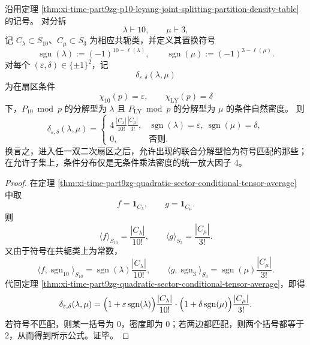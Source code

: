 \begin{theorem}[双二次扇区中的联合分解型条件密度全公式]\label{thm:xi-time-part9zg-quadratic-sector-conditional-splitting-density}
沿用定理 \ref{thm:xi-time-part9zg-p10-leyang-joint-splitting-partition-density-table} 的记号。
对分拆
\[
\lambda\vdash 10,
\qquad
\mu\vdash 3,
\]
记 \(C_\lambda\subset S_{10}\)、\(C_\mu\subset S_3\) 为相应共轭类，并定义其置换符号
\[
\operatorname{sgn}(\lambda):=(-1)^{10-\ell(\lambda)},
\qquad
\operatorname{sgn}(\mu):=(-1)^{3-\ell(\mu)}.
\]
对每个 \((\varepsilon,\delta)\in\{\pm1\}^2\)，记
\[
\delta_{\varepsilon,\delta}(\lambda,\mu)
\]
为在扇区条件
\[
\chi_{10}(p)=\varepsilon,
\qquad
\chi_{\mathrm{LY}}(p)=\delta
\]
下，\(P_{10}\bmod p\) 的分解型为 \(\lambda\) 且 \(P_{\mathrm{LY}}\bmod p\) 的分解型为 \(\mu\) 的条件自然密度。
则
\[
\boxed{\;
\delta_{\varepsilon,\delta}(\lambda,\mu)=
\begin{cases}
\displaystyle
4\,\frac{|C_\lambda|}{10!}\frac{|C_\mu|}{3!},
& \operatorname{sgn}(\lambda)=\varepsilon,\ \operatorname{sgn}(\mu)=\delta,\\[8pt]
0,
& \text{否则}.
\end{cases}\;}
\]
换言之，进入任一双二次扇区之后，允许出现的联合分解型恰为符号匹配的那些；在允许子集上，条件分布仅是无条件乘法密度的统一放大因子 \(4\)。
\end{theorem}
\begin{proof}
在定理 \ref{thm:xi-time-part9zg-quadratic-sector-conditional-tensor-average} 中取
\[
f=\mathbf 1_{C_\lambda},
\qquad
g=\mathbf 1_{C_\mu}.
\]
则
\[
\langle f\rangle_{S_{10}}=\frac{|C_\lambda|}{10!},
\qquad
\langle g\rangle_{S_3}=\frac{|C_\mu|}{3!}.
\]
又由于符号在共轭类上为常数，
\[
\langle f,\operatorname{sgn}_{10}\rangle_{S_{10}}
=
\operatorname{sgn}(\lambda)\frac{|C_\lambda|}{10!},
\qquad
\langle g,\operatorname{sgn}_{3}\rangle_{S_3}
=
\operatorname{sgn}(\mu)\frac{|C_\mu|}{3!}.
\]
代回定理 \ref{thm:xi-time-part9zg-quadratic-sector-conditional-tensor-average}，即得
\[
\delta_{\varepsilon,\delta}(\lambda,\mu)
=
\Bigl(1+\varepsilon\operatorname{sgn}(\lambda)\Bigr)\frac{|C_\lambda|}{10!}
\cdot
\Bigl(1+\delta\operatorname{sgn}(\mu)\Bigr)\frac{|C_\mu|}{3!}.
\]
若符号不匹配，则某一括号为 \(0\)，密度即为 \(0\)；若两边都匹配，则两个括号都等于 \(2\)，从而得到所示公式。证毕。
\end{proof}

